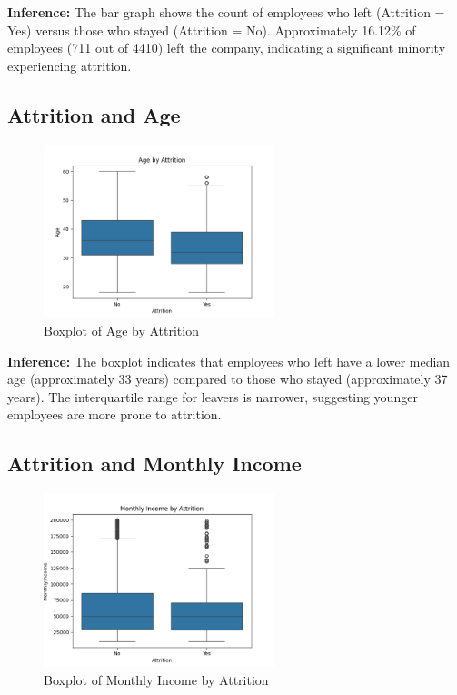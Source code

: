 \documentclass[12pt, a4paper]{article}
\begin{document}
\textbf{Inference:} The bar graph shows the count of employees who left (Attrition = Yes) versus those who stayed (Attrition = No). Approximately 16.12\% of employees (711 out of 4410) left the company, indicating a significant minority experiencing attrition.

\subsection{Attrition and Age}
\begin{figure}[H]
    \centering
    \includegraphics[width=0.6\textwidth]{plots/attrition_age_boxplot.png}
    \caption{Boxplot of Age by Attrition}
    \label{fig:attrition_age}
\end{figure}

\textbf{Inference:} The boxplot indicates that employees who left have a lower median age (approximately 33 years) compared to those who stayed (approximately 37 years). The interquartile range for leavers is narrower, suggesting younger employees are more prone to attrition.

\subsection{Attrition and Monthly Income}
\begin{figure}[H]
    \centering
    \includegraphics[width=0.6\textwidth]{plots/attrition_income_boxplot.png}
    \caption{Boxplot of Monthly Income by Attrition}
    \label{fig:attrition_income}
\end{figure}
\end{document}
